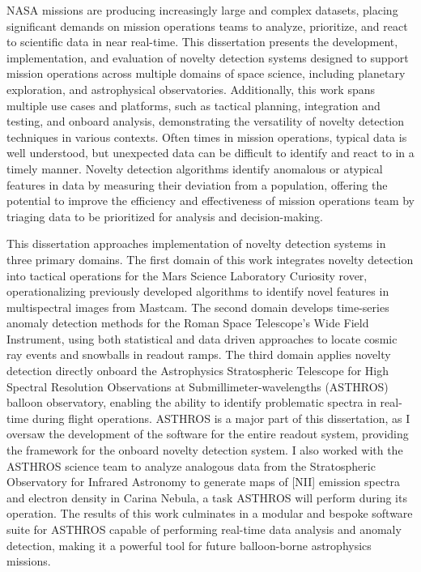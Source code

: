 NASA missions are producing increasingly large and complex datasets, placing significant demands on mission operations teams to analyze, prioritize, and react to scientific data in near real-time. 
This dissertation presents the development, implementation, and evaluation of novelty detection systems designed to support mission operations across multiple domains of space science, including planetary exploration, and astrophysical observatories. 
Additionally, this work spans multiple use cases and platforms, such as tactical planning, integration and testing, and onboard analysis, demonstrating the versatility of novelty detection techniques in various contexts.
Often times in mission operations, typical data is well understood, but unexpected data can be difficult to identify and react to in a timely manner.
Novelty detection algorithms identify anomalous or atypical features in data by measuring their deviation from a population, offering the potential to improve the efficiency and effectiveness of mission operations team by triaging data to be prioritized for analysis and decision-making.

This dissertation approaches implementation of novelty detection systems in three primary domains. 
The first domain of this work integrates novelty detection into tactical operations for the Mars Science Laboratory Curiosity rover, operationalizing previously developed algorithms to identify novel features in multispectral images from Mastcam.
The second domain develops time-series anomaly detection methods for the Roman Space Telescope's Wide Field Instrument, using both statistical and data driven approaches to locate cosmic ray events and snowballs in readout ramps. 
The third domain applies novelty detection directly onboard the Astrophysics Stratospheric Telescope for High Spectral Resolution Observations at Submillimeter-wavelengths (ASTHROS) balloon observatory, enabling the ability to identify problematic spectra in real-time during flight operations.
ASTHROS is a major part of this dissertation, as I oversaw the development of the software for the entire readout system, providing the framework for the onboard novelty detection system.
I also worked with the ASTHROS science team to analyze analogous data from the Stratospheric Observatory for Infrared Astronomy to generate maps of [NII] emission spectra and electron density in Carina Nebula, a task ASTHROS will perform during its operation.
The results of this work culminates in a modular and bespoke software suite for ASTHROS capable of performing real-time data analysis and anomaly detection, making it a powerful tool for future balloon-borne astrophysics missions.
